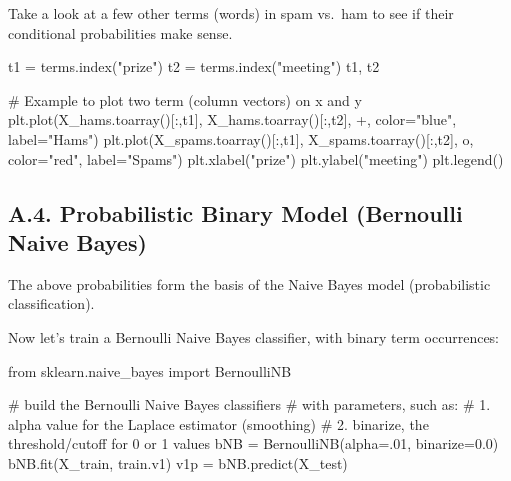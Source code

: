 \documentclass[
  letterpaper,
]{scrbook}
\newenvironment{Shaded}{\begin{snugshade}}{\end{snugshade}}
\newcommand{\CommentTok}[1]{\textcolor[rgb]{0.37,0.37,0.37}{#1}}
\newcommand{\FloatTok}[1]{\textcolor[rgb]{0.68,0.00,0.00}{#1}}
\newcommand{\ImportTok}[1]{\textcolor[rgb]{0.00,0.46,0.62}{#1}}
\newcommand{\NormalTok}[1]{\textcolor[rgb]{0.00,0.23,0.31}{#1}}
\newcommand{\OperatorTok}[1]{\textcolor[rgb]{0.37,0.37,0.37}{#1}}
\newcommand{\StringTok}[1]{\textcolor[rgb]{0.13,0.47,0.30}{#1}}
\begin{document}
Take a look at a few other terms (words) in spam vs.~ham to see if their
conditional probabilities make sense.

\begin{Shaded}
\begin{Highlighting}[]
\NormalTok{t1 }\OperatorTok{=}\NormalTok{ terms.index(}\StringTok{"prize"}\NormalTok{)}
\NormalTok{t2 }\OperatorTok{=}\NormalTok{ terms.index(}\StringTok{"meeting"}\NormalTok{)}
\NormalTok{t1, t2}
\end{Highlighting}
\end{Shaded}

\begin{Shaded}
\begin{Highlighting}[]
\CommentTok{\# Example to plot two term (column vectors) on x and y}
\NormalTok{plt.plot(X\_hams.toarray()[:,t1], X\_hams.toarray()[:,t2], }\StringTok{\textquotesingle{}+\textquotesingle{}}\NormalTok{, color}\OperatorTok{=}\StringTok{"blue"}\NormalTok{, label}\OperatorTok{=}\StringTok{"Hams"}\NormalTok{)}
\NormalTok{plt.plot(X\_spams.toarray()[:,t1], X\_spams.toarray()[:,t2], }\StringTok{\textquotesingle{}o\textquotesingle{}}\NormalTok{, color}\OperatorTok{=}\StringTok{"red"}\NormalTok{, label}\OperatorTok{=}\StringTok{"Spams"}\NormalTok{)}
\NormalTok{plt.xlabel(}\StringTok{"prize"}\NormalTok{)}
\NormalTok{plt.ylabel(}\StringTok{"meeting"}\NormalTok{)}
\NormalTok{plt.legend()}
\end{Highlighting}
\end{Shaded}

\subsection*{A.4. Probabilistic Binary Model (Bernoulli Naive
Bayes)}\label{a.4.-probabilistic-binary-model-bernoulli-naive-bayes}

The above probabilities form the basis of the Naive Bayes model
(probabilistic classification).

Now let's train a Bernoulli Naive Bayes classifier, with binary term
occurrences:

\begin{Shaded}
\begin{Highlighting}[]
\ImportTok{from}\NormalTok{ sklearn.naive\_bayes }\ImportTok{import}\NormalTok{ BernoulliNB}

\CommentTok{\# build the Bernoulli Naive Bayes classifiers}
\CommentTok{\# with parameters, such as: }
\CommentTok{\# 1. alpha value for the Laplace estimator (smoothing)}
\CommentTok{\# 2. binarize, the threshold/cutoff for 0 or 1 values}
\NormalTok{bNB }\OperatorTok{=}\NormalTok{ BernoulliNB(alpha}\OperatorTok{=}\FloatTok{.01}\NormalTok{, binarize}\OperatorTok{=}\FloatTok{0.0}\NormalTok{)}
\NormalTok{bNB.fit(X\_train, train.v1)}
\NormalTok{v1p }\OperatorTok{=}\NormalTok{ bNB.predict(X\_test)}
\end{Highlighting}
\end{Shaded}
\end{document}
